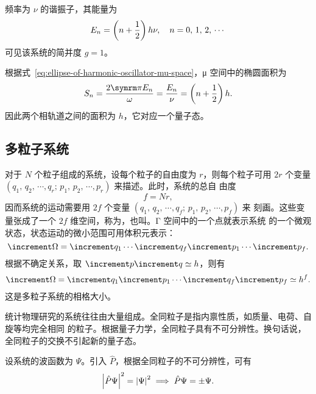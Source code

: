\begin{example}[一维谐振子]
  频率为 $\nu$ 的谐振子，其能量为
  \begin{equation}
    E_n = \qty(n+\frac{1}{2}) \, h\nu \qc n = 0, \, 1, \, 2, \, \cdots
  \end{equation}
  可见该系统的简并度 $g=1$。

  根据式~\eqref{eq:ellipse-of-harmonic-oscillator-mu-space}，μ 空间中的椭圆面积为
  \begin{equation}
    S_n = \frac{2\pp E_n}{\omega} =\frac{E_n}{\nu} = \qty(n+\frac{1}{2}) \, h.
  \end{equation}
  因此两个相轨道之间的面积为 $h$，它对应一个量子态。
\end{example}

\begin{example}[转子]
\end{example}

\subsection{多粒子系统}

对于 $N$ 个粒子组成的系统，设每个粒子的自由度为 $r$，则每个粒子可用 $2r$ 个变量
$(q_1, \, q_2, \, \cdots, q_r; \, \allowbreak p_1, \, p_2, \, \cdots, p_r)$ 来描述。此时，系统的总自
由度
\begin{equation}
  f = Nr,
\end{equation}
因而系统的运动需要用 $2f$ 个变量 $(q_1, \, q_2, \, \cdots, q_f; \, p_1, \, p_2, \, \cdots, p_f)$ 来
刻画。这些变量张成了一个 $2f$ 维空间，称为，也叫。Γ 空间中的一个点就表示系统
的一个微观状态，状态运动的微小范围可用体积元表示：
\begin{equation}
  \incr{\Omega} = \incr{q_1} \cdots \incr{q_f} \incr{p_1} \cdots \incr{p_f}.
\end{equation}
根据不确定关系，取 $\incr{p} \incr{q} \simeq h$，则有
\begin{equation}
  \incr{\Omega} = \incr{q_1} \incr{p_1} \cdots \incr{q_f} \incr{p_f} \simeq h^f.
\end{equation}
这是多粒子系统的相格大小。

统计物理研究的系统往往由大量组成。全同粒子是指内禀性质，如质量、电荷、自旋等均完全相同
的粒子。根据量子力学，全同粒子具有不可分辨性。换句话说，全同粒子的交换不引起新的量子态。

设系统的波函数为 $\Psi$。引入 $\hat{P}$，根据全同粒子的不可分辨性，可有
\begin{equation}
  \abs{\hat{P}\Psi}^2 = \abs{\Psi}^2 \implies \hat{P}\Psi = \pm\Psi.
\end{equation}

